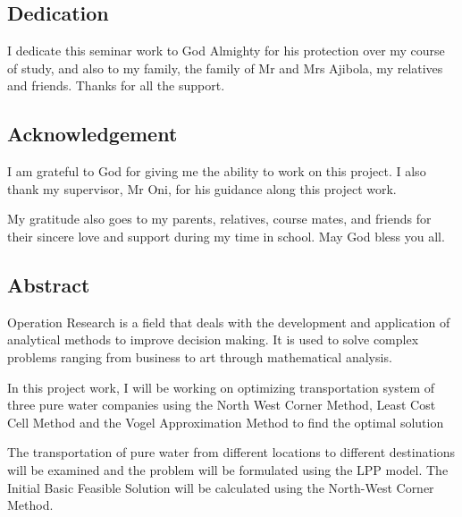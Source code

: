 \documentclass{article}
\begin{document}
\newpage

\begin{center}
	\subsection{Dedication}
\end{center}


{\large I dedicate this seminar work to God Almighty for his protection over my course of study, and also to my family, the family of Mr and Mrs Ajibola, my relatives and friends. Thanks for all the support.}

\newpage

\begin{center}
	\subsection{Acknowledgement}
\end{center}

{\large I am grateful to God for giving me the ability to work on this project. I also thank my supervisor, Mr Oni, for his guidance along this project work.

My gratitude also goes to my parents, relatives, course mates, and friends for their sincere love and support during my time in school. May God bless you all.}

\newpage

\begin{center}
	\subsection{Abstract}
\end{center}


{\large Operation Research is a field that deals with the development and application of analytical methods to improve decision making. It is used to solve complex problems ranging from business to art through mathematical analysis.

In this project work, I will be working on optimizing transportation system of three pure water companies using the North West Corner Method, Least Cost Cell Method and the Vogel Approximation Method to find the optimal solution

The transportation of pure water from different locations to different destinations will be examined and the problem will be formulated using the LPP model. The Initial Basic Feasible Solution will be calculated using the North-West Corner Method.}
\newpage
\end{document}
